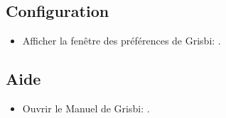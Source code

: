 \subsection{Configuration}

\begin{itemize}
	\item Afficher la fenêtre des préférences de Grisbi: .
\end{itemize}

\subsection{Aide}

\begin{itemize}
	\item Ouvrir le Manuel de Grisbi: .
\end{itemize}













